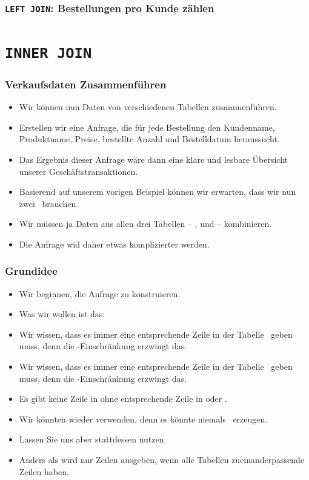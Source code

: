 \documentclass[aspectratio=169,mathserif,notheorems]{beamer}%
\begin{document}
%
\begin{frame}[t]
\frametitle{\texttt{LEFT JOIN}: Bestellungen pro Kunde zählen}%
%
%
\end{frame}
%
\section{\texttt{INNER JOIN}}%
%
\begin{frame}%
\frametitle{Verkaufsdaten Zusammenführen}%
\begin{itemize}%
\item Wir können nun Daten von verschiedenen Tabellen zusammenführen.%
\item<2-> Erstellen wir eine Anfrage, die für jede Bestellung den Kundenname, Produktname, Preise, bestellte Anzahl und Bestelldatum heraussucht.%
\item<3-> Das Ergebnis dieser Anfrage wäre dann eine klare und lesbare Übersicht unserer Geschäftstransaktionen.%
\item<4-> Basierend auf unserem vorigen Beispiel können wir erwarten, dass wir nun zwei~ brauchen.%
\item<5-> Wir müssen ja Daten aus allen drei Tabellen -- ,  und  -- kombinieren.%
\item<6-> Die Anfrage wid daher etwas komplizierter werden.%
\end{itemize}%
\end{frame}%
%
\begin{frame}%
\frametitle{Grundidee}%
\begin{itemize}%
\item Wir beginnen, die Anfrage zu konstruieren.%
\item<2-> Was wir wollen ist das:~\emph{}%
\item<3-> Wir wissen, dass es immer eine entsprechende Zeile in der Tabelle~ geben muss, denn die -Einschränkung erzwingt das.%
\item<4-> Wir wissen, dass es immer eine entsprechende Zeile in der Tabelle~ geben muss, denn die -Einschränkung erzwingt das.%
\item<5-> Es gibt keine Zeile in  ohne entsprechende Zeile in  oder .%
\item<6-> Wir könnten wieder  verwenden, denn es könnte niemals~ erzeugen.%
\item<7-> Lassen Sie uns aber stattdessen \cite{PGDG:PD:JT} nutzen.%
\item<8-> Anders als  wird  nur Zeilen ausgeben, wenn alle Tabellen zueinanderpassende Zeilen haben.%
\end{itemize}%
\end{frame}%
\end{document}
